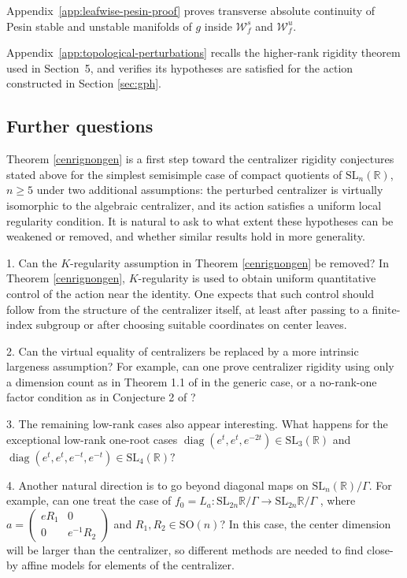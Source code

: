 \documentclass[11pt]{amsart}
\numberwithin{equation}{section}
\newcommand{\R}{\mathbb{R}}
\theoremstyle{plain}
\begin{document}
Appendix~\ref{app:leafwise-pesin-proof} proves transverse absolute
continuity of Pesin stable and unstable manifolds of $g$ inside $\mathcal W_f^s$ and $\mathcal W_f^u$.

Appendix~\ref{app:topological-perturbations}
recalls the
higher-rank rigidity theorem used in Section~5, and verifies its
hypotheses are satisfied for the action constructed in
Section \ref{sec:gph}.

\subsection{Further questions}
Theorem \ref{cenrignongen} is a first step toward the
centralizer rigidity conjectures stated above for the simplest semisimple case of compact quotients of
\(\mathrm{SL}_n(\mathbb R)\), \(n\ge5\)
under two additional assumptions:
the perturbed centralizer is virtually isomorphic to the algebraic
centralizer, and its action satisfies a uniform local regularity condition.
It is natural to ask to what extent these hypotheses can be weakened or
removed, and whether similar results hold in more generality.

1. Can the \(K\)-regularity assumption in Theorem \ref{cenrignongen} be removed?
 In Theorem \ref{cenrignongen}, \(K\)-regularity is used to obtain
uniform quantitative control of the action near the identity.  One expects
that such control should follow from the structure of the centralizer itself,
at least after passing to a finite-index subgroup or after choosing suitable
coordinates on center leaves. 



2. Can the virtual equality of centralizers  be replaced
by a more intrinsic largeness assumption? For example, can one prove centralizer rigidity using only a dimension count as in Theorem 1.1 of \cite{Wang} in the generic case, or a no-rank-one factor condition as in Conjecture 2 of \cite{DWWX}?

3. The remaining low-rank cases also appear interesting.  
What happens for the exceptional low-rank one-root cases 
$
        \operatorname{diag}(e^t,e^t,e^{-2t})\in \mathrm{SL}_3(\mathbb R)
$
and
$
        \operatorname{diag}(e^t,e^t,e^{-t},e^{-t})
        \in \mathrm{SL}_4(\mathbb R)?
$


4. Another natural direction is to go beyond diagonal maps on
\(\mathrm{SL}_n(\mathbb R)/\Gamma\).  For example, can one treat the case of $f_0=L_a: \mathrm{SL}_{2n}\R/\Gamma\to \mathrm{SL}_{2n}\R/\Gamma$ , where $a=\begin{pmatrix}
    eR_1&0\\0& e^{-1}R_2
\end{pmatrix}$  and $R_1,R_2\in \mathrm{SO}(n)$?  In this case, the center dimension will be larger than the centralizer, so different methods are needed to find close-by affine models for elements of the centralizer. 
\end{document}
